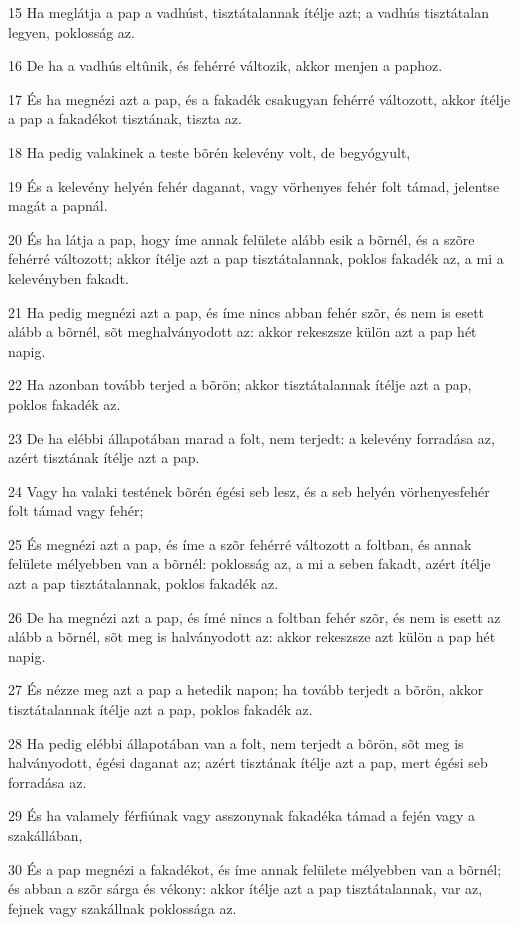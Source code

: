 \par 15 Ha meglátja a pap a vadhúst, tisztátalannak ítélje azt; a vadhús tisztátalan legyen, poklosság az.
\par 16 De ha a vadhús eltûnik, és fehérré változik, akkor menjen a paphoz.
\par 17 És ha megnézi azt a pap, és a fakadék csakugyan fehérré változott, akkor ítélje a pap a fakadékot tisztának, tiszta az.
\par 18 Ha pedig valakinek a teste bõrén kelevény volt, de begyógyult,
\par 19 És a kelevény helyén fehér daganat, vagy vörhenyes fehér folt támad, jelentse magát a papnál.
\par 20 És ha látja a pap, hogy íme annak felülete alább esik a bõrnél, és a szõre fehérré változott; akkor ítélje azt a pap tisztátalannak, poklos fakadék az, a mi a kelevényben fakadt.
\par 21 Ha pedig megnézi azt a pap, és íme nincs abban fehér szõr, és nem is esett alább a bõrnél, sõt meghalványodott az: akkor rekeszsze külön azt a pap hét napig.
\par 22 Ha azonban tovább terjed a bõrön; akkor tisztátalannak ítélje azt a pap, poklos fakadék az.
\par 23 De ha elébbi állapotában marad a folt, nem terjedt: a kelevény forradása az, azért tisztának ítélje azt a pap.
\par 24 Vagy ha valaki testének bõrén égési seb lesz, és a seb helyén vörhenyesfehér folt támad vagy fehér;
\par 25 És megnézi azt a pap, és íme a szõr fehérré változott a foltban, és annak felülete mélyebben van a bõrnél: poklosság az, a mi a seben fakadt, azért ítélje azt a pap tisztátalannak, poklos fakadék az.
\par 26 De ha megnézi azt a pap, és ímé nincs a foltban fehér szõr, és nem is esett az alább a bõrnél, sõt meg is halványodott az: akkor rekeszsze azt külön a pap hét napig.
\par 27 És nézze meg azt a pap a hetedik napon; ha tovább terjedt a bõrön, akkor tisztátalannak ítélje azt a pap, poklos fakadék az.
\par 28 Ha pedig elébbi állapotában van a folt, nem terjedt a bõrön, sõt meg is halványodott, égési daganat az; azért tisztának ítélje azt a pap, mert égési seb forradása az.
\par 29 És ha valamely férfiúnak vagy asszonynak fakadéka támad a fején vagy a szakállában,
\par 30 És a pap megnézi a fakadékot, és íme annak felülete mélyebben van a bõrnél; és abban a szõr sárga és vékony: akkor ítélje azt a pap tisztátalannak, var az, fejnek vagy szakállnak poklossága az.
